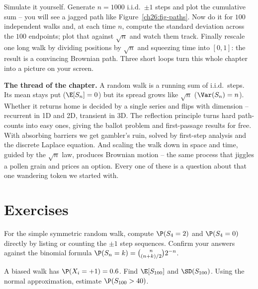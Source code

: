 \begin{labbox}
Simulate it yourself. Generate $n = 1000$ i.i.d.\ $\pm 1$ steps and plot the
cumulative sum -- you will see a jagged path like
Figure~\ref{ch26:fig-paths}. Now do it for $100$ independent walks and, at each
time $n$, compute the standard deviation across the $100$ endpoints; plot that
against $\sqrt{n}$ and watch them track. Finally rescale one long walk by
dividing positions by $\sqrt{n}$ and squeezing time into $[0,1]$: the result is
a convincing Brownian path. Three short loops turn this whole chapter into a
picture on your screen.
\end{labbox}

\begin{recoverybox}
\textbf{The thread of the chapter.} A random walk is a running sum of i.i.d.\
steps. Its mean stays put ($\E[S_n] = 0$) but its spread grows like $\sqrt{n}$
($\Var(S_n) = n$). Whether it returns home is decided by a single series and
flips with dimension -- recurrent in 1D and 2D, transient in 3D. The reflection
principle turns hard path-counts into easy ones, giving the ballot problem and
first-passage results for free. With absorbing barriers we get gambler's ruin,
solved by first-step analysis and the discrete Laplace equation. And scaling
the walk down in space and time, guided by the $\sqrt{n}$ law, produces
Brownian motion -- the same process that jiggles a pollen grain and prices an
option. Every one of these is a question about that one wandering token we
started with.
\end{recoverybox}

\section{Exercises}
\label{ch26:exercises}

\begin{exercise}
\label{ch26:ex-warmup}
For the simple symmetric random walk, compute $\P(S_4 = 2)$ and $\P(S_4 = 0)$
directly by listing or counting the $\pm 1$ step sequences. Confirm your
answers against the binomial formula $\P(S_n = k) = \binom{n}{(n+k)/2}2^{-n}$.
\end{exercise}

\begin{exercise}
\label{ch26:ex-biasedmoments}
A biased walk has $\P(X_i = +1) = 0.6$. Find $\E[S_{100}]$ and
$\SD(S_{100})$. Using the normal approximation, estimate $\P(S_{100} > 40)$.
\end{exercise}

